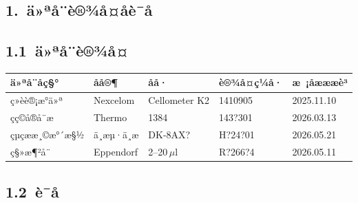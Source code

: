 \documentclass[UTF8,10pt,a4paper,fontset=fandol]{ctexart}
\newcommand{\fieldvalue}[1]{#1}
\newcommand{\handwritten}[1]{#1}
\begin{document}
\begin{center}
\begin{center}
\section*{1.\ ä»ªå¨è®¾å¤åè¯å}

\subsection*{1.1\ ä»ªå¨è®¾å¤}

\begin{tabularx}{\textwidth}{|l|l|l|X|X|}
\hline
ä»ªå¨åç§° & åå®¶ & åå· & è®¾å¤ç¼å· & æ ¡åæææè³\\
\hline
ç»èè®¡æ°ä»ª & Nexcelom & Cellometer K2 &
\fieldvalue{\handwritten{1410905}} &
\fieldvalue{\handwritten{2025.11.10}}\\
\hline
çç©å®å¨æ & Thermo & 1384 &
\fieldvalue{\handwritten{143?301}} &
\fieldvalue{\handwritten{2026.03.13}}\\
\hline
çµç­ææ¸©æ°´æ§½ & ä¸æµ·ä¸æ &
\fieldvalue{\handwritten{DK-8AX?}} &
\fieldvalue{\handwritten{H?24?01}} &
\fieldvalue{\handwritten{2026.05.21}}\\
\hline
ç§»æ¶²å¨ & Eppendorf &
\fieldvalue{\handwritten{2--20\,$\mu$l}} &
\fieldvalue{\handwritten{R?266?4}} &
\fieldvalue{\handwritten{2026.05.11}}\\
\hline
\end{tabularx}

\subsection*{1.2\ è¯å}


\end{center}
\end{center}
\end{document}
